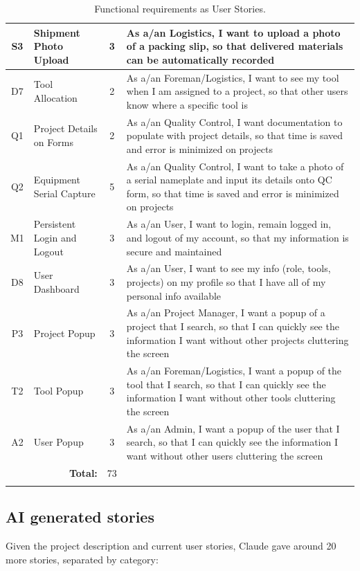 \documentclass{article}
\begin{document}
\begin{longtable}[h]{c l c p{10cm}}
S3 & Shipment Photo Upload & 3 & As a/an Logistics, I want to upload a photo of a packing slip, so that delivered materials can be automatically recorded \\ \hline
D7 & Tool Allocation & 2 & As a/an Foreman/Logistics, I want to see my tool when I am assigned to a project, so that other users know where a specific tool is \\ \hline
Q1 & Project Details on Forms &	2 & As a/an Quality Control, I want documentation to populate with project details, so that time is saved and error is minimized on projects \\ \hline
Q2 & Equipment Serial Capture &	5 & As a/an Quality Control, I want to take a photo of a serial nameplate and input its details onto QC form, so that time is saved and error is minimized on projects \\ \hline
M1 & Persistent Login and Logout & 3 & As a/an User, I want to login, remain logged in, and logout of my account, so that my information is secure and maintained \\ \hline
D8 & User Dashboard & 3 & As a/an User, I want to see my info (role, tools, projects) on my profile so that I have all of my personal info available \\ \hline
P3 & Project Popup & 3 & As a/an Project Manager, I want a popup of a project that I search, so that I can quickly see the information I want without other projects cluttering the screen \\ \hline
T2 & Tool Popup & 3 & As a/an Foreman/Logistics, I want a popup of the tool that I search, so that I can quickly see the information I want without other tools cluttering the screen \\ \hline
A2 & User Popup & 3 & As a/an Admin, I want a popup of the user that I search, so that I can quickly see the information I want without other users cluttering the screen \\ \hline


\multicolumn{2}{r}{\bf Total: } & 73 & \\ \hline

\caption{Functional requirements as User Stories.}\label{tab:functional-req}
\end{longtable}

\subsection{AI generated stories}
Given the project description and current user stories, Claude gave around 20 more stories, separated by category:
\end{document}

